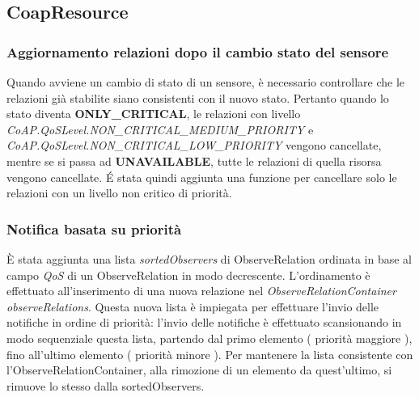 			\subsection{CoapResource}
				\subsubsection{Aggiornamento relazioni dopo il cambio stato del sensore}\label{cambioStatoSensore}
				Quando avviene un cambio di stato di un sensore, è necessario controllare che le relazioni già stabilite siano consistenti con il nuovo stato. Pertanto quando lo stato diventa \textbf{ONLY\_CRITICAL}, le relazioni con livello \textit{CoAP.QoSLevel.NON\_CRITICAL\_MEDIUM\_PRIORITY} e \textit{CoAP.QoSLevel.NON\_CRITICAL\_LOW\_PRIORITY} vengono cancellate, mentre se si passa ad \textbf{UNAVAILABLE}, tutte le relazioni di quella risorsa vengono cancellate. \'E stata quindi aggiunta una funzione per cancellare solo le relazioni con un livello non critico di priorità. \newline
				
				\subsubsection{Notifica basata su priorità}
				È stata aggiunta una lista \textit{sortedObservers} di ObserveRelation ordinata in base al campo \textit{QoS} di un ObserveRelation in modo decrescente. L’ordinamento è effettuato all’inserimento di una nuova relazione nel \textit{ObserveRelationContainer observeRelations}. Questa nuova lista è impiegata per effettuare l’invio delle notifiche in ordine di priorità: l'invio delle notifiche è effettuato scansionando in modo sequenziale questa lista, partendo dal primo elemento ( priorità maggiore ), fino all'ultimo elemento ( priorità minore ). Per mantenere la lista consistente con l’ObserveRelationContainer, alla rimozione di un elemento da quest’ultimo, si rimuove lo stesso dalla sortedObservers.\newline
				
				
				
				

